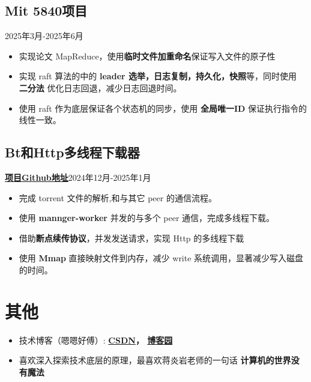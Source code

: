 \documentclass[11pt]{article}
\begin{document}
    \subsection{Mit 5840项目\hfill }
    
   \hfill 2025年3月-2025年6月
    \begin{itemize}
        \item 实现论文 MapReduce，使用\textbf{临时文件加重命名}保证写入文件的原子性
        \item 实现 raft 算法的中的 \textbf{leader 选举，日志复制，持久化，快照}等，同时使用 \textbf{二分法} 优化日志回退，减少日志回退时间。
        \item 使用 raft 作为底层保证各个状态机的同步，使用 \textbf{全局唯一ID} 保证执行指令的线性一致。
    \end{itemize}
    
    \vspace{1em}                %
    \subsection{Bt和Http多线程下载器 \hfill }

      \textbf{\href{https://github.com/zhummq/goDownLoad}{项目Github地址}}\hfill 2024年12月-2025年1月
    \begin{itemize}
        \item 完成 torrent 文件的解析,和与其它 peer 的通信流程。
        \item 使用 \textbf{mannger-worker} 并发的与多个 peer 通信，完成多线程下载。
        \item 借助\textbf{断点续传协议}，并发发送请求，实现 Http 的多线程下载
        \item 使用 \textbf{Mmap} 直接映射文件到内存，减少 write 系统调用，显著减少写入磁盘的时间。
    \end{itemize}

    \section{\makebox[\widthof{\faInfo}][c]{\color{NPU_Blue}{\faInfo}}\quad 其他}
    \begin{itemize}
        \item 技术博客（嗯嗯好傅）: \textbf{\href{https://blog.csdn.net/2301_81836829?spm=1010.2135.3001.5421}{CSDN}， \href{https://www.cnblogs.com/eehaofu}{博客园}}
        \item 喜欢深入探索技术底层的原理，最喜欢蒋炎岩老师的一句话 \textbf{计算机的世界没有魔法}
    \end{itemize}
\end{document}
